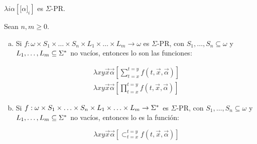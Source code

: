   \begin{lemma}
    \par $\lambda i\alpha \left[\lbrack \alpha]_{i}\right]$ es $\Sigma$-PR.
  \end{lemma}

  \begin{lemma}
    \par Sean $n, m \geq 0$.

    \begin{enumerate}[a)]
      \item Si $f: \omega \times S_{1} \times \dotsc \times S_{n} \times L_{1} \times \dotsc \times L_{m} \rightarrow
        \omega$ es $\Sigma$-PR, con $ S_{1}, \dotsc, S_{n} \subseteq \omega$ y $L_{1}, \dotsc, L_{m} \subseteq \Sigma^{\ast}$
        no vacíos, entonces lo son las funciones:

        \begin{eqnarray}
          \nonumber \lambda xy\vec{x}\vec{\alpha} \left[\sum_{t=x}^{t=y} f(t,\vec{x},\vec{\alpha})\right] \\
          \nonumber \lambda xy\vec{x}\vec{\alpha} \left[\prod_{t=x}^{t=y}f(t,\vec{x},\vec{\alpha})\right]
        \end{eqnarray}

      \item Si $f: \omega \times S_{1} \times \dotsc \times S_{n} \times L_{1} \times \dotsc \times L_{m} \rightarrow
        \Sigma^{\ast}$ es $\Sigma$-PR, con $ S_{1}, \dotsc, S_{n} \subseteq \omega$ y $L_{1}, \dotsc, L_{m} \subseteq \Sigma^{\ast}$
        no vacíos, entonces lo es la función:

        \[
          \lambda xy\vec{x}\vec{\alpha}\left[\subset_{t=x}^{t=y} f(t,\vec{x},\vec{\alpha})\right]
        \]
    \end{enumerate}
  \end{lemma}

